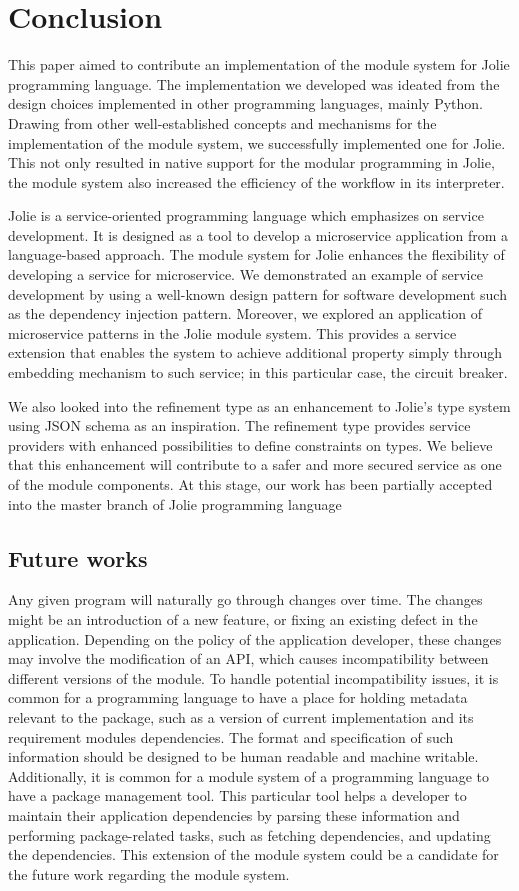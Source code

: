 \chapter{Conclusion}
This paper aimed to contribute an implementation of the module system for Jolie programming language.
The implementation we developed was ideated from the design choices implemented in other programming languages, mainly Python.
Drawing from other well-established concepts and mechanisms for the implementation of the module system, we successfully implemented one for Jolie.
This not only resulted in native support for the modular programming in Jolie, the module system also increased the efficiency of the workflow in its interpreter.

Jolie is a service-oriented programming language which emphasizes on service development. It is designed as a tool to develop a microservice application from a language-based approach. The module system for Jolie enhances the flexibility of developing a service for microservice. We demonstrated an example of service development by using a well-known design pattern for software development such as the dependency injection pattern. Moreover, we explored an application of microservice patterns in the Jolie module system. This provides a service extension that enables the system to achieve additional property simply through embedding mechanism to such service; in this particular case, the circuit breaker.

We also looked into the refinement type as an enhancement to Jolie’s type system using JSON schema as an inspiration. The refinement type provides service providers with enhanced possibilities to define constraints on types. We believe that this enhancement will contribute to a safer and more secured service as one of the module components.
At this stage, our work has been partially accepted into the master branch of Jolie programming language

\section{Future works}

Any given program will naturally go through changes over time. The changes might be an introduction of a new feature, or fixing an existing defect in the application. Depending on the policy of the application developer, these changes may involve the modification of an API, which causes incompatibility between different versions of the module. To handle potential incompatibility issues, it is common for a programming language to have a place for holding metadata relevant to the package, such as a version of current implementation and its requirement modules dependencies. The format and specification of such information should be designed to be human readable and machine writable. Additionally, it is common for a module system of a programming language to have a package management tool. This particular tool helps a developer to maintain their application dependencies by parsing these information and performing package-related tasks, such as fetching dependencies, and updating the dependencies. This extension of the module system could be a candidate for the future work regarding the module system.

